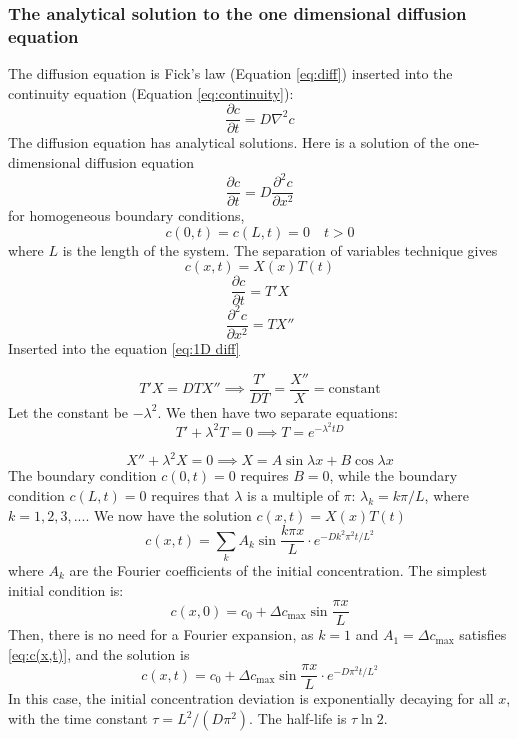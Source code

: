 \documentclass{article}
\begin{document}
\subsubsection{The analytical solution to the one dimensional diffusion equation}\label{analytical solution}
The diffusion equation is Fick's law (Equation \ref{eq:diff}) inserted into the continuity equation (Equation \ref{eq:continuity}): 
\begin{equation}
\frac{\partial c}{\partial t} = D\nabla^2 c
\end{equation}
The diffusion equation has analytical solutions. Here is a solution of the one-dimensional diffusion equation 
\begin{equation}\label{eq:1D diff}
\frac{\partial c}{\partial t} = D\frac{\partial^2 c}{\partial x^2}
\end{equation}
for homogeneous boundary conditions, 
$$c(0,t) = c(L,t)=0 \quad t>0$$ where $L$ is the length of the system. The separation of variables technique gives 
\begin{equation*}
c(x,t) = X(x)T(t)
\end{equation*}
\begin{equation*}
\frac{\partial c}{\partial t} = T'X
\end{equation*}
\begin{equation*}
\frac{\partial^2 c}{\partial x^2} = TX''
\end{equation*}
Inserted into the equation \ref{eq:1D diff}

\begin{equation*}
T'X  = DTX''\implies \frac{T'}{DT} = \frac{X''}{X} =\text{constant}
\end{equation*}
Let the constant be $-\lambda ^2$. We then have two separate equations:
\begin{equation*}
T' + \lambda^2 T = 0 \implies T=e^{-\lambda^2 tD}
\end{equation*}

\begin{equation*}
X'' + \lambda^2X = 0 \implies X=A \sin \lambda x + B\cos \lambda x
\end{equation*}
The boundary condition $c(0,t) = 0$ requires $B=0$, while the boundary condition $c(L,t)=0$ requires that $\lambda$ is a multiple of $\pi$: $\lambda_k = k\pi /L$, where $k = 1,2,3,...$. 
We now have the solution $c(x,t)=X(x)T(t)$
\begin{equation}\label{eq:c(x,t)}
c(x,t) = \sum_k A_k \sin \frac{k \pi x}{L}\cdot e^{-Dk^2\pi^2 t /L^2}
\end{equation}
where $A_k$ are the Fourier coefficients of the initial concentration.
The simplest initial condition is: 
$$c(x,0) =c_0 +  \Delta c_{\text{max}}\sin{\frac{\pi x}{L}}$$
Then, there is no need for a Fourier expansion, as $k=1$ and $A_1 = \Delta c_{\text{max}}$ satisfies \ref{eq:c(x,t)}, and the solution is
\begin{equation*}
c(x,t) =c_0 + \Delta c_{\text{max}} \sin \frac{ \pi x}{L}\cdot e^{-D\pi^2 t /L^2}
\end{equation*}
In this case, the initial concentration deviation is exponentially  decaying for all $x$, with the time constant $\tau = L^2/(D\pi^2)$. The half-life is $\tau \ln 2$.
\end{document}
